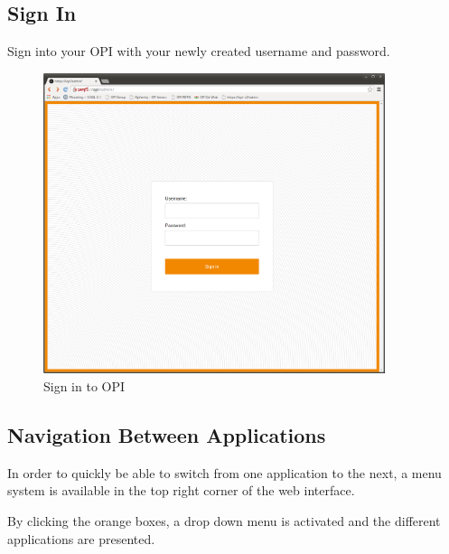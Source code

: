 \documentclass[12pt,a4paper,titlepage]{article}
\begin{document}
\subsection{Sign In}
Sign into your OPI with your newly created username and password. 
\begin{figure}[h!]
\centering
\includegraphics[width=10cm]{./img/sign-in}
\caption{Sign in to OPI}
\end{figure}

\newpage
\subsection{Navigation Between Applications}
In order to quickly be able to switch from one application to the next, a menu system is available in the top right corner of the web interface.

By clicking the orange boxes, a drop down menu is activated and the different applications are presented. 
\end{document}
